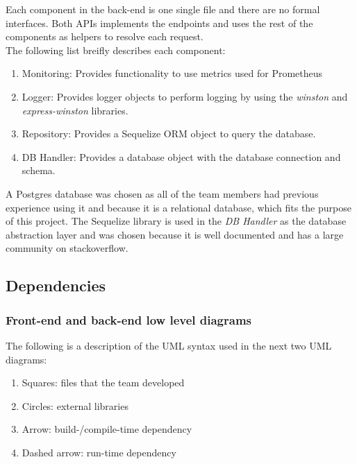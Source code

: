 Each component in the back-end is one single file and there are no formal interfaces. Both APIs implements the endpoints and uses the rest of the components as helpers to resolve each request.\\
The following list breifly describes each component:
\begin{enumerate}
    \item Monitoring: Provides functionality to use metrics used for Prometheus
    \item Logger: Provides logger objects to perform logging by using the \textit{winston} and \textit{express-winston} libraries.
    \item Repository: Provides a Sequelize ORM object to query the database.
    \item DB Handler: Provides a database object with the database connection and schema.
\end{enumerate}

A Postgres database was chosen as all of the team members had previous experience using it and because it is a relational database, which fits the purpose of this project. The Sequelize library is used in the \textit{DB Handler} as the database abstraction layer and was chosen because it is well documented \cite{sequelize} and has a large community on stackoverflow.

\newpage
\subsection{Dependencies}

\subsubsection{Front-end and back-end low level diagrams}
The following is a description of the UML syntax used in the next two UML diagrams:
\begin{enumerate}
    \item Squares: files that the team developed
    \item Circles: external libraries
    \item Arrow: build-/compile-time dependency
    \item Dashed arrow: run-time dependency
\end{enumerate}

